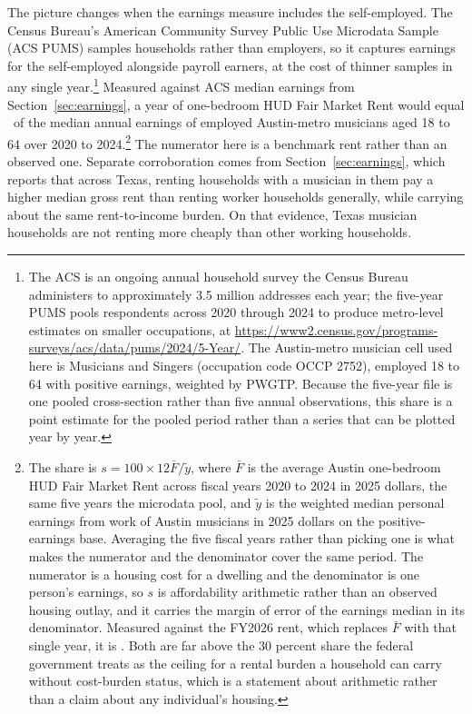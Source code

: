 The picture changes when the earnings measure includes the self-employed. The
Census Bureau's American Community Survey Public Use Microdata Sample (ACS
PUMS) samples households rather than employers, so it captures earnings for
the self-employed alongside payroll earners, at the cost of thinner samples in
any single year.\footnote{The ACS is an ongoing annual household survey the
Census Bureau administers to approximately 3.5 million addresses each year;
the five-year PUMS pools respondents across 2020 through 2024 to produce
metro-level estimates on smaller occupations, at
\url{https://www2.census.gov/programs-surveys/acs/data/pums/2024/5-Year/}. The
Austin-metro musician cell used here is Musicians and Singers (occupation
code OCCP 2752), employed 18 to 64 with positive earnings, weighted by PWGTP.
Because the five-year file is one pooled cross-section rather than five
annual observations, this share is a point estimate for the pooled period
rather than a series that can be plotted year by year.} Measured against ACS
median earnings from Section~\ref{sec:earnings}, a year of one-bedroom HUD
Fair Market Rent would equal \NColPumsRentShareMatched\ of the median annual
earnings of employed Austin-metro musicians aged 18 to 64 over 2020 to
2024.\footnote{The share is
\(s = 100 \times 12\bar{F} \big/ \tilde{y}\), where \(\bar{F}\) is the
average Austin one-bedroom HUD Fair Market Rent across fiscal years 2020 to
2024 in 2025 dollars, the same five years the microdata pool, and
\(\tilde{y}\) is the weighted median personal earnings from work of Austin
musicians in 2025 dollars on the positive-earnings base. Averaging the five
fiscal years rather than picking one is what makes the numerator and the
denominator cover the same period. The numerator is a housing cost for a
dwelling and the denominator is one person's earnings, so \(s\) is
affordability arithmetic rather than an observed housing outlay, and it
carries the margin of error of the earnings median in its denominator.
Measured against the FY2026 rent, which replaces \(\bar{F}\) with that single
year, it is \NColPumsRentShareLatest. Both are far above the 30 percent share
the federal government treats as the ceiling for a rental burden a household
can carry without cost-burden status, which is a statement about arithmetic
rather than a claim about any individual's housing.} The numerator here is a
benchmark rent rather than an observed one. Separate corroboration comes from
Section~\ref{sec:earnings}, which reports that across Texas, renting
households with a musician in them pay a higher median gross rent than
renting worker households generally, while carrying about the same
rent-to-income burden. On that evidence, Texas musician households are not
renting more cheaply than other working households.

